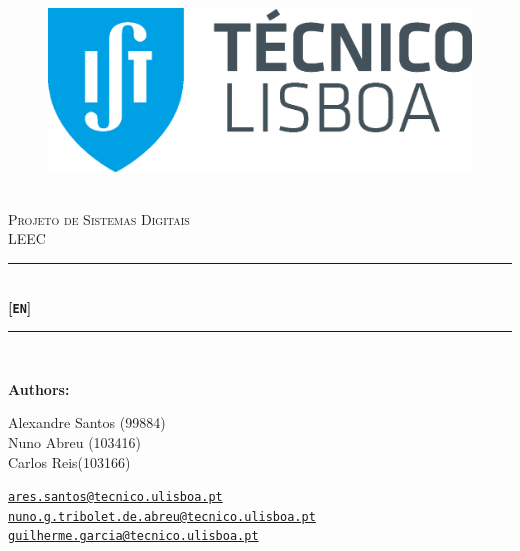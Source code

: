 \documentclass[12pt]{article}
\newcommand{\HRule}{\rule{\linewidth}{0.5mm}} %
\begin{document}
\begin{center}
    \begin{figure}
        \vspace{-1.0cm}
        \includegraphics[scale = 0.3, left]{Imagens/IST_A.eps} %
    \end{figure}
    \mbox{}\\[2.0cm]
    \textsc{\Huge Projeto de Sistemas Digitais}\\[2.5cm]
    \textsc{\LARGE LEEC}\\[2.0cm]
    \HRule\\[0.4cm]
    {\large \bf {\selectfont } [\texttt{EN}]}\\[0.2cm]
    \HRule\\[1.5cm]
\end{center}

\begin{flushleft}
    \textbf{\selectfont Authors:}
\end{flushleft}

\begin{center}
    \begin{minipage}{0.4\textwidth}
        \begin{flushleft}
            Alexandre Santos (99884)\\
            Nuno Abreu (103416)\\
            Carlos Reis(103166)\\
        \end{flushleft}
    \end{minipage}%
    \begin{minipage}{0.6\textwidth}
        \begin{flushright}
            \href{mailto:ares.santos@tecnico.ulisboa.pt}{\texttt{ares.santos@tecnico.ulisboa.pt}}\\
            \href{mailto:nuno.g.tribolet.de.abreu@tecnico.ulisboa.pt}{\texttt{nuno.g.tribolet.de.abreu@tecnico.ulisboa.pt}}\\
            \href{mailto:guilherme.garcia@tecnico.ulisboa.pt}{\texttt{guilherme.garcia@tecnico.ulisboa.pt}}\\
            
        \end{flushright}
    \end{minipage}


\end{center}
    
\end{document}
